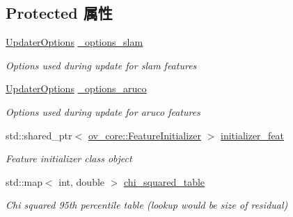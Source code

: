 \subsection*{Protected 属性}
\begin{DoxyCompactItemize}
\item 
\mbox{\label{classov__msckf_1_1UpdaterSLAM_a219d1a88421f59b953e65e835776cfd9}} 
\hyperlink{structov__msckf_1_1UpdaterOptions}{Updater\+Options} \hyperlink{classov__msckf_1_1UpdaterSLAM_a219d1a88421f59b953e65e835776cfd9}{\+\_\+options\+\_\+slam}
\begin{DoxyCompactList}\small\item\em Options used during update for slam features \end{DoxyCompactList}\item 
\mbox{\label{classov__msckf_1_1UpdaterSLAM_abf282c84f49d9ec4514c530b3a97f683}} 
\hyperlink{structov__msckf_1_1UpdaterOptions}{Updater\+Options} \hyperlink{classov__msckf_1_1UpdaterSLAM_abf282c84f49d9ec4514c530b3a97f683}{\+\_\+options\+\_\+aruco}
\begin{DoxyCompactList}\small\item\em Options used during update for aruco features \end{DoxyCompactList}\item 
\mbox{\label{classov__msckf_1_1UpdaterSLAM_a2adf90e25fa4a3abf697eba018e0b65e}} 
std\+::shared\+\_\+ptr$<$ \hyperlink{classov__core_1_1FeatureInitializer}{ov\+\_\+core\+::\+Feature\+Initializer} $>$ \hyperlink{classov__msckf_1_1UpdaterSLAM_a2adf90e25fa4a3abf697eba018e0b65e}{initializer\+\_\+feat}
\begin{DoxyCompactList}\small\item\em Feature initializer class object \end{DoxyCompactList}\item 
\mbox{\label{classov__msckf_1_1UpdaterSLAM_a550ec76668fcbb2a8cb8245c6c08fddd}} 
std\+::map$<$ int, double $>$ \hyperlink{classov__msckf_1_1UpdaterSLAM_a550ec76668fcbb2a8cb8245c6c08fddd}{chi\+\_\+squared\+\_\+table}
\begin{DoxyCompactList}\small\item\em Chi squared 95th percentile table (lookup would be size of residual) \end{DoxyCompactList}\end{DoxyCompactItemize}


